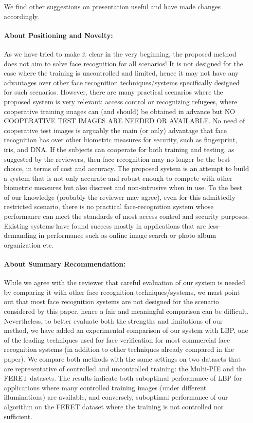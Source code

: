 \documentclass[11pt]{article}
\begin{document}
We find other suggestions on presentation useful and have made changes
accordingly. 

\paragraph{About Positioning and Novelty:} As we have tried to make it clear in
the very beginning, the proposed method does not aim to solve face recognition
for all scenarios! It is not designed for the case where the training is
uncontrolled and limited, hence it may not have any advantages over other face
recognition techniques/systems specifically designed for such scenarios.
However, there are many practical scenarios where the proposed system is very
relevant: access control or recognizing refugees, where cooperative training
images can (and should) be obtained in advance but NO COOPERATIVE TEST IMAGES
ARE NEEDED OR AVAILABLE. No need of cooperative test images is arguably the
main (or only) advantage that face recognition has over other biometric
measures for security, such as fingerprint, iris, and DNA.  If the subjects can
cooperate for both training and testing, as suggested by the reviewers, then
face recognition may no longer be the best choice, in terms of cost and
accuracy. The proposed system is an attempt to build a system that is not only
accurate and robust enough to compete with other biometric measures but also
discreet and non-intrusive when in use. To the best of our knowledge (probably
the reviewer may agree), even for this admittedly restricted scenario, there is
no practical face-recognition system whose performance can meet the standards
of most access control and security purposes. Existing systems have found
success  mostly in applications that are less-demanding in performance such as
online image search or photo album organization etc. 

\paragraph{About Summary Recommendation:} While we agree with the reviewer that
careful evaluation of our system is needed by comparing it with other face
recognition techniques/systems, we must point out that most face recognition
systems are not designed for the scenario considered by this paper, hence a
fair and meaningful comparison can be difficult. Nevertheless, to better
evaluate both the strengths and limitations of our method, we have added an
experimental comparison of our system with LBP, one of the leading techniques
used for face verification for most commercial face recognition systems (in
addition to other techniques already compared in the paper). We compare both
methods with the same settings on two datasets that are representative of
controlled and uncontrolled training: the Multi-PIE and the FERET datasets.
The results indicate both suboptimal performance of LBP for applications where
many controlled training images (under different illuminations) are available,
and conversely, suboptimal performance of our algorithm on the FERET dataset
where the training is not controlled nor sufficient.
\end{document}

